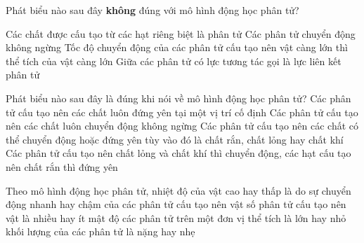 \begin{ex}
	Phát biểu nào sau đây \textbf{không} đúng với mô hình động học phân tử?
	
	\choice
	{Các chất được cấu tạo từ các hạt riêng biệt là phân tử}
	{Các phân tử chuyển động không ngừng}
	{\True Tốc độ chuyển động của các phân tử cấu tạo nên vật càng lớn thì thể tích của vật càng lớn}
	{Giữa các phân tử có lực tương tác gọi là lực liên kết phân tử}
	\end{ex}




\newpage 
\begin{ex} 
	Phát biểu nào sau đây là đúng khi nói về mô hình động học phân tử?
	\choice
	{Các phân tử cấu tạo nên các chất luôn đứng yên tại một vị trí cố định}
	{\True Các phân tử cấu tạo nên các chất luôn chuyển động không ngừng}
	{Các phân tử cấu tạo nên các chất có thể chuyển động hoặc đứng yên tùy vào đó là chất rắn, chất lỏng hay chất khí}
	{Các phân tử cấu tạo nên chất lỏng và chất khí thì chuyển động, các hạt cấu tạo nên chất rắn thì đứng yên}
\end{ex}

\begin{ex} 
	Theo mô hình động học phân tử, nhiệt độ của vật cao hay thấp là do
	\choice
	{\True sự chuyển động nhanh hay chậm của các phân tử cấu tạo nên vật}
	{số phân tử cấu tạo nên vật là nhiều hay ít}
	{mật độ các phân tử trên một đơn vị thể tích là lớn hay nhỏ}
	{khối lượng của các phân tử là nặng hay nhẹ}
\end{ex}

